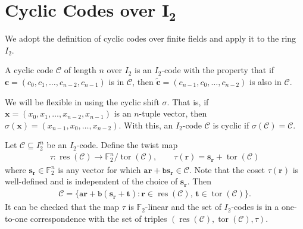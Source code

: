 \documentclass[12pt]{article}
\theoremstyle{definition}
\theoremstyle{plain}
\begin{document}
\section{Cyclic Codes over $\boldsymbol{I_2}$}    \label{sec:cyclic-I2}

We adopt the definition of cyclic codes over finite fields and apply it to the ring $I_2$.

A cyclic code $\mathcal{C}$ of length $n$ over $I_2$ is an $I_2$-code with the property that if $\mathbf{c} = ( c_0 , c_1 , \dotsc , c_{n-2} , c_{n-1} )$ is in $\mathcal{C}$, then $\tilde{\mathbf{c}} = ( c_{n-1} , c_0 , \dotsc , c_{n-2}  )$ is also in $\mathcal{C}$.

We will be flexible in using the cyclic shift $\sigma$. That is, if  $\mathbf{x} = ( x_0 , x_1 , \dotsc , x_{n-2} , x_{n-1} )$ is an $n$-tuple vector, then $\sigma ( \mathbf{x} ) = ( x_{n-1} , x_0 , \dotsc , x_{n-2}  )$. With this, an $I_2$-code $\mathcal{C}$ is cyclic if $\sigma (\mathcal{C}) = \mathcal{C}$.



Let $\mathcal{C} \subseteq I_2^n$ be an $I_2$-code. Define the twist map
\begin{align*}
\tau \colon  \operatorname{res} (\mathcal{C})  \to  \mathbb{F}_2^n /  \operatorname{tor}  ( \mathcal{C}  ) ,  \qquad      \tau  ( \mathbf{r} ) =   \mathbf{s}_\mathbf{r}  +  \operatorname{tor}  ( \mathcal{C} )
\end{align*}
where $\mathbf{s}_\mathbf{r}  \in  \mathbb{F} _2^n$ is any vector for which $ \mathtt{a}  \mathbf{r}  +  \mathtt{b}  \mathbf{s}_\mathbf{r}  \in \mathcal{C}$. Note that the coset $ \tau ( \mathbf{r} )$ is well-defined and is independent of the choice of $ \mathbf{s}_\mathbf{r} $. Then
\begin{align*}
\mathcal{C}
=
\{  \mathtt{a} \mathbf{r}  +  \mathtt{b}  ( \mathbf{s}_\mathbf{r}  + \mathbf{t}   ) \mathrel{:}  \mathbf{r}  \in  \operatorname{res}  (\mathcal{C}) ,  \,  \mathbf{t}  \in  \operatorname{tor} (\mathcal{C})   \}  .
\end{align*}
It can be checked that the map $\tau$ is $\mathbb{F}_2$-linear and the set of $I_2$-codes is in a one-to-one correspondence with the set of triples $( \operatorname{res}  (\mathcal{C}) , \operatorname{tor}  (\mathcal{C}),  \tau )$.
\end{document}
